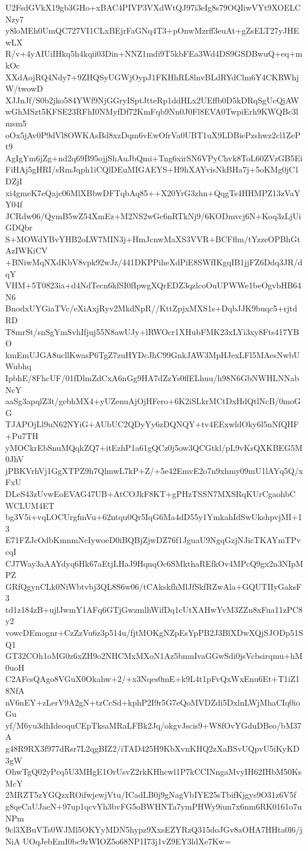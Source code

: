 U2FsdGVkX19gb3GHo+xBAC4PIVP3VXdWtQJ97i3eIg8s79OQIiwVYt9XOELCNzy7
y8loMEh0UmQC727VI1CLxBEjrFaGNq4T3+pOnwMzrff3euAt+gZsELT27yJHEwLX
R/v+4yAIUiIHkq5h4kqii03Din+NNZ1mdi9T5kbFEa3Wd4DS9GSDBwuQ+eq+mkOc
XXdAojRQ4Ndy7+9ZHQSyUGWjOypJ1FKHhRL8lnvBLdRYdClm6Y4CKRWhjW/twowD
XJJnJf/S0b2jko584YWf9NjGGryISptJtteRp1ddHLx2UEffb0D5kDRqSgUcQjAW
wGhMSzt5KFSE23RFhI0NMyfDf72KmFqb9Nn0J0Fl8EVA0TwpiErh9KWQBc3lmsm5
oOx5jAv0P9dVl8OWKAsBd8xzDqm6vEwOfrVa0UBT1uX9LDBiePzshwz2cl1ZePt9
AgIgYm6jZg+nd2q69B95ojjShAuJbQmi+Tng6xirSN6VPyChvk8ToL60ZVzGB5Ei
FiHAj5gHRI/sRmJqph1iCQlDEuMIGAEYS+H9hXAYvisNkBHa7j+5oKMg0jC1DZjI
xi4gmeK7eQajc06MlXBbwDFTqbAq85++X20YrG3zhn+QqgTs4HHMPZ13zVaYY04f
JCRdw06/QymB5wZ54XmEz+M2NS2wGc6nRTkNj9/6KODmvcj6N+Koq3zLjUiGDQbr
S+MOWdYBvYHB2oLW7MIN3j+HmJcnwMaXS3VVR+BCFflm/tYzzeOPBhGtAzIWKiCV
+BNiwMqNXdKbV8vpk92wJz/441DKPPiheXdPiE8SWfIKgqIB1jjFZ6Ddq3JR/dqY
VHM+5T0823ia+d4NdTecn6kfSI0fIpwgXQrEDZ3qzlcoOuUPWWe1beOgvbHB64N6
BnodxUYGiaTVc/eXiAxjRyv2MkdNpR//KttZpjxMXS1s+DqbJJK9buqc5+rjtdRD
T8mrSt/snSgYmSvhIfjuj55N8awUJy+lRWOcr1XHubFMK23xLYi3xy8Fts417YBO
kmEmUJGA8ucllKwasP6TgZ7zuHYDcJhC99GnkJAW3MpHJexLFl5MAesNwbUWubhq
IpbhE/8FhcUF/01fDlmZdCxA6nGg9HA7dZzYs0flELhuu/h98N6GbNWHLNNabNcY
aaSg3apqlZ3t/gebhMX4+yUZenuAjOjHFero+6K2iSLkrMCtDxHdQtlNcB/0moGG
TJAPOjLl9uN62NYiG+AUbUC2QDyYy6zDQNQY+tv4EExwldOky6l5nNfQHF+Pu7TH
yMOCkrEbSnuMQqkZQ7+itEzhP1a61gQCz0j5ow3QCGtkl/pL9vKsQXKBEG5M0JhV
jPBKVrhVj1GgXTPZ9h7QlmwL7kP+Z/+5e42EmvE2o7n9xhmy09mU1lAYq5Q/xFxU
DLeS43zUvwEoEVAG47UB+AtCOJkF8KT+gPHzTSSN7MXSRqKUrCgaohbCWCLUM4ET
bg3V5i+vqLOCUrgfmVu+62ntqu0Qr5IqG6Ma4dD55y1YmkahIdSwUkshpvjMI+13
E71FZJcOdbKmnmNcIywoeD0iBQBjZjwDZ76f1JguaU9NgqGzjNJicTKAYmTPvcqI
CJ7Way3aAAYdyq6Hk67aEtjLHaJ9HqnqOc6SMkthaREfkOv4MPcQ9gx2n3NIpMPZ
GRfQgynCLk0NiWbtvbj3QL8S6w06/tCAkskfhMlJfSkfRZwAla+GQUTIIyGaksF3
td1z184zB+ujlJwmY1AFq6GTjGwzmlhWifDq1cUtXAHwYvM3ZZu8xFua11zPC8y2
vowcDEmognr+CzZzVu6z3p514u/fjtMOKgNZpEsYpPB2J3BlXDwXQjSJODp51SQ1
GT32COh1oMG0z6xZH9o2NHCMxMXoN1Az5bmnIvaGGwSdi0jsVcbsirqmu+hM0uoH
C2AFcsQAgo8VGuX0Okahw+2/+x3Nqes0mE+k9L4t1pFvQxWxEnu6Et+T1iZ18NfA
nV6nEY+zLerV9A2gN+tzCcSd+kphP2I9r5G7eQoMVDZdi5DxlnLWjMhaCIq0ioGu
yf/M6yu3dhIdeoquCEpTksaMRaLFBk2Jq/okgvJscis9+W8fOvYGduDBeo/bM37A
g48R9RX3f977dRsr7L2qgBIZ2/iTAD425H9KbXvnKHQ2zXaBSvUQpvU5iKyKD3gW
OhwTgQ02yPcq5U3MHgE1OrUsvZ2rkKHhcwl1P7kCCINngaMvyIH62IHbM50KsMcY
2MRZT5zYGQzxROifwjewjVtu/ICadLB0j9gNagVbIYE25sTbifKjgys9O31z6V5f
g8qeCaUJaeN+97up1qcvYh3bvFG5oBWHNTa7ymPHWy9iun7x6nm6RK0161o7uNPm
9cl3XBuVTs0WJMl5OKYyMDN5hypz9XxsEZYRzQ315doJGv8aOHA7HHta0l6/jNiA
UOqJebEmI0bc9zWIOZ5o68NP1I73j1vZ9EY3ldXe7Kw=
